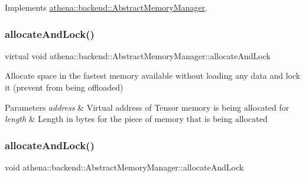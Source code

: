 Implements \mbox{\hyperlink{classathena_1_1backend_1_1_abstract_memory_manager_a1b80008e94c21d5ac87f9a45d3f212a8}{athena\+::backend\+::\+Abstract\+Memory\+Manager}}.

\mbox{\label{classathena_1_1backend_1_1generic_1_1_generic_memory_manager_a1b80008e94c21d5ac87f9a45d3f212a8}} 
\subsubsection{\texorpdfstring{allocate\+And\+Lock()}{allocateAndLock()}\hspace{0.1cm}{\footnotesize\ttfamily [2/4]}}
{\footnotesize\ttfamily virtual void athena\+::backend\+::\+Abstract\+Memory\+Manager\+::allocate\+And\+Lock}

Allocate space in the fastest memory available without loading any data and lock it (prevent from being offloaded) 
\begin{DoxyParams}{Parameters}
{\em address} & Virtual address of Tensor memory is being allocated for \\
\hline
{\em length} & Length in bytes for the piece of memory that is being allocated \\
\hline
\end{DoxyParams}
\mbox{\label{classathena_1_1backend_1_1generic_1_1_generic_memory_manager_ad40a653a8b32410956ba835ca1bb3e5f}} 
\subsubsection{\texorpdfstring{allocate\+And\+Lock()}{allocateAndLock()}\hspace{0.1cm}{\footnotesize\ttfamily [3/4]}}
{\footnotesize\ttfamily void athena\+::backend\+::\+Abstract\+Memory\+Manager\+::allocate\+And\+Lock}


